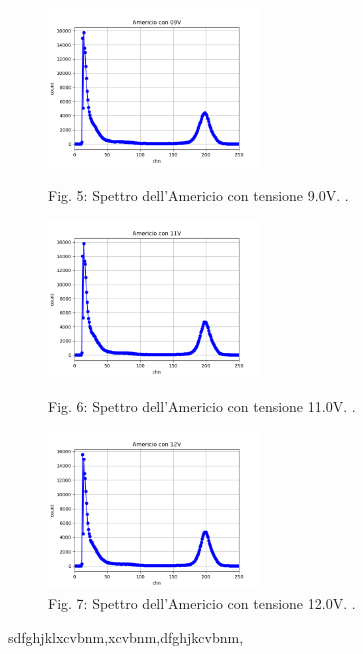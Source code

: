 \documentclass[a4paper]{article}
\begin{document}
\begin{figure}[!h]
\includegraphics[width=0.5\textwidth]{Americio_con_09V}
        \caption{Fig. 5: Spettro dell'Americio con tensione 9.0V. .}
        \label{fig:5}

\includegraphics[width=0.5\textwidth]{Americio_con_11V}
        \caption{Fig. 6: Spettro dell'Americio con tensione 11.0V. .}
        \label{fig:6}

\includegraphics[width=0.5\textwidth]{Americio_con_12V}
        \caption{Fig. 7: Spettro dell'Americio con tensione 12.0V. .}
        \label{fig:7}
\end{figure}  
\newpage
	sdfghjklxcvbnm,xcvbnm,dfghjkcvbnm,
\end{document}

